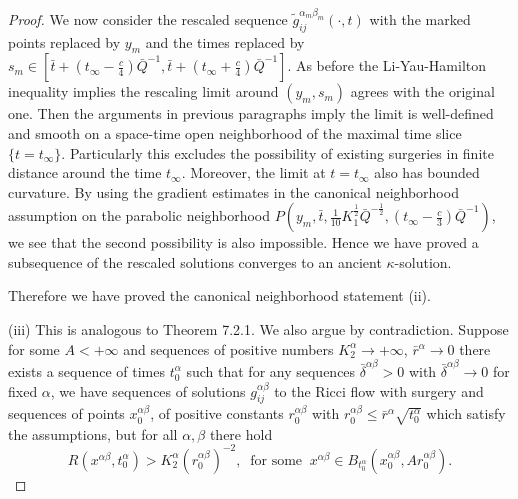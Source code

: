 \begin{proof}
We now consider the rescaled sequence
$\widetilde{g}_{ij}^{\alpha_m\beta_m}(\cdot,t)$ with the marked
points replaced by $y_m$ and the times replaced by $s_m \in [\bar
t+(t_{\infty}-\frac{c}{4})\bar{Q}^{-1},
\bar{t}+(t_{\infty}+\frac{c}{4})\bar{Q}^{-1}]$. As before the
Li-Yau-Hamilton inequality implies the rescaling limit around
$(y_m,s_m)$ agrees with the original one. Then the arguments in
previous paragraphs imply the limit is well-defined and smooth on
a space-time open neighborhood of the maximal time slice
$\{t=t_{\infty}\}$. Particularly this excludes the possibility of
existing surgeries in finite distance around the time
$t_{\infty}$. Moreover, the limit at $t=t_{\infty}$ also has
bounded curvature. By using the gradient estimates in the
canonical neighborhood assumption on the parabolic neighborhood
$P(y_m,\bar t,\frac{1}{10}K_1^{\frac{1}{2}}\bar{Q}^{-\frac{1}{2}},
(t_{\infty}-\frac{c}{3})\bar{Q}^{-1})$, we see that the second
possibility is also impossible. Hence we have proved a subsequence
of the rescaled solutions converges to an ancient
$\kappa$-solution.

Therefore we have proved the canonical neighborhood statement
(ii).

\medskip
(iii) This is analogous to Theorem 7.2.1. We also argue by
contradiction. Suppose for some $A<+\infty$ and sequences of
positive numbers $K^{\alpha}_2\rightarrow+\infty$,
$\bar{r}^{\alpha}\rightarrow0$ there exists a sequence of times
$t^{\alpha}_0$ such that for any sequences
$\bar{\delta}^{\alpha\beta}>0$ with
$\bar{\delta}^{\alpha\beta}\rightarrow0$ for fixed $\alpha$, we
have sequences of solutions $g^{\alpha\beta}_{ij}$ to the Ricci
flow with surgery and sequences of points $x^{\alpha\beta}_0$, of
positive constants $r^{\alpha\beta}_0$ with $r^{\alpha\beta}_0\leq
\bar{r}^{\alpha}\sqrt{t^{\alpha}_0}$ which satisfy the
assumptions, but for all $\alpha,\beta$ there hold \begin{equation}
R(x^{\alpha\beta},t^{\alpha}_0)>K^{\alpha}_2(r^{\alpha\beta}_0)^{-2},\
\mbox{ for some } \ x^{\alpha\beta}\in
B_{t^{\alpha}_0}(x^{\alpha\beta}_0,Ar^{\alpha\beta}_0).
\end{equation}


\end{proof}
